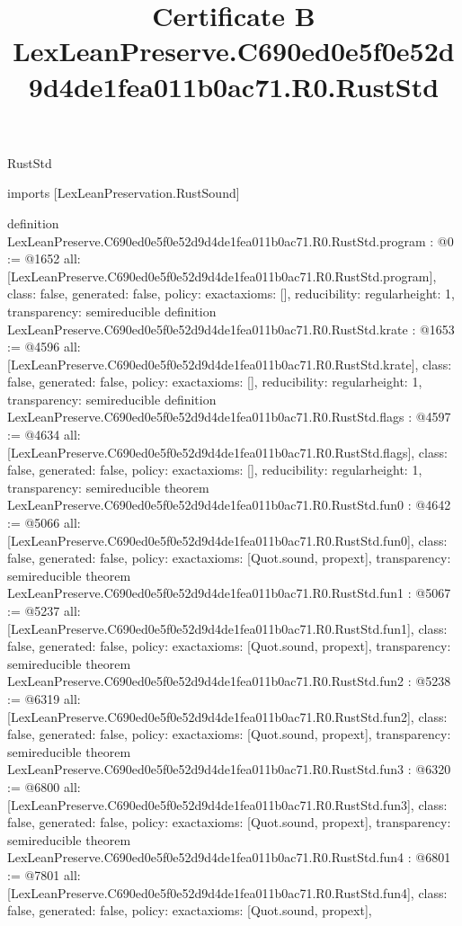 \begin{lexlean}{RustStd}
\title{Certificate B LexLeanPreserve.C690ed0e5f0e52d9d4de1fea011b0ac71.R0.RustStd}
\begin{coremodule}
imports [LexLeanPreservation.RustSound]

definition LexLeanPreserve.C690ed0e5f0e52d9d4de1fea011b0ac71.R0.RustStd.program : @0 := @1652 {
  all: [LexLeanPreserve.C690ed0e5f0e52d9d4de1fea011b0ac71.R0.RustStd.program],
  class: false,
  generated: false,
  policy: exact{axioms: []},
  reducibility: regular{height: 1},
  transparency: semireducible
}
definition LexLeanPreserve.C690ed0e5f0e52d9d4de1fea011b0ac71.R0.RustStd.krate : @1653 := @4596 {
  all: [LexLeanPreserve.C690ed0e5f0e52d9d4de1fea011b0ac71.R0.RustStd.krate],
  class: false,
  generated: false,
  policy: exact{axioms: []},
  reducibility: regular{height: 1},
  transparency: semireducible
}
definition LexLeanPreserve.C690ed0e5f0e52d9d4de1fea011b0ac71.R0.RustStd.flags : @4597 := @4634 {
  all: [LexLeanPreserve.C690ed0e5f0e52d9d4de1fea011b0ac71.R0.RustStd.flags],
  class: false,
  generated: false,
  policy: exact{axioms: []},
  reducibility: regular{height: 1},
  transparency: semireducible
}
theorem LexLeanPreserve.C690ed0e5f0e52d9d4de1fea011b0ac71.R0.RustStd.fun0 : @4642 := @5066 {
  all: [LexLeanPreserve.C690ed0e5f0e52d9d4de1fea011b0ac71.R0.RustStd.fun0],
  class: false,
  generated: false,
  policy: exact{axioms: [Quot.sound, propext]},
  transparency: semireducible
}
theorem LexLeanPreserve.C690ed0e5f0e52d9d4de1fea011b0ac71.R0.RustStd.fun1 : @5067 := @5237 {
  all: [LexLeanPreserve.C690ed0e5f0e52d9d4de1fea011b0ac71.R0.RustStd.fun1],
  class: false,
  generated: false,
  policy: exact{axioms: [Quot.sound, propext]},
  transparency: semireducible
}
theorem LexLeanPreserve.C690ed0e5f0e52d9d4de1fea011b0ac71.R0.RustStd.fun2 : @5238 := @6319 {
  all: [LexLeanPreserve.C690ed0e5f0e52d9d4de1fea011b0ac71.R0.RustStd.fun2],
  class: false,
  generated: false,
  policy: exact{axioms: [Quot.sound, propext]},
  transparency: semireducible
}
theorem LexLeanPreserve.C690ed0e5f0e52d9d4de1fea011b0ac71.R0.RustStd.fun3 : @6320 := @6800 {
  all: [LexLeanPreserve.C690ed0e5f0e52d9d4de1fea011b0ac71.R0.RustStd.fun3],
  class: false,
  generated: false,
  policy: exact{axioms: [Quot.sound, propext]},
  transparency: semireducible
}
theorem LexLeanPreserve.C690ed0e5f0e52d9d4de1fea011b0ac71.R0.RustStd.fun4 : @6801 := @7801 {
  all: [LexLeanPreserve.C690ed0e5f0e52d9d4de1fea011b0ac71.R0.RustStd.fun4],
  class: false,
  generated: false,
  policy: exact{axioms: [Quot.sound, propext]},
}
\end{coremodule}
\end{lexlean}
